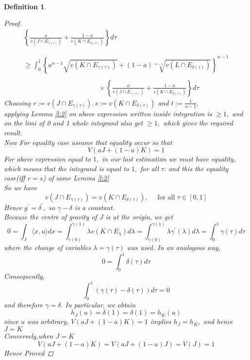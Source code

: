 \documentclass[oneside]{book}
\newtheorem{mydef}{Definition}
\begin{document}
\begin{mydef}
\begin{proof}
\[\begin{array}{l}
 \left\{\frac{a}{v\left(J \cap E_{\gamma(\tau)}\right)}+\frac{1-a}{v\left(K \cap E_{\delta(\tau)}\right)}\right\} d \tau \\\\\\
\geq \int_{0}^{1} \left\{  a^{n-1} \sqrt{v\left(K \cap E_{\gamma(\tau)}\right)}+(1-a) \sqrt[n-1]{v\left(L \cap E_{\delta(\tau)}\right)} \right\}^{n-1} \\\\
\quad \quad \quad \quad \quad \quad \quad \quad \quad \quad \quad \times \left\{ \frac{a}{v\left(J \cap E_{\gamma(\tau)}\right)}+\frac{1-a}{v\left(K \cap E_{\delta(\tau)}\right)}\right\} d \tau
\end{array}
\]
Choosing $r:=v\left(J \cap E_{\gamma(\tau)}\right), s:=v\left(K \cap E_{\delta(\tau)}\right)$ and $t:=\frac{1}{n-1},$
\\
applying  Lemma \ref{l:2} on above expression written inside integration is $\geq 1,$ and on the limi of 0 and 1 whole integrand also get  $\geq 1,$ which gives the required result.
\\
 Now For equality case assume that equality occur so that
\[
V(a J+(1-a) K) = 1 
\]
 For above expression equal to $1,$ in our last estimation we must have equality, which means that the integrand  is equal to $1,$ for all $\tau .
 $ and this the equality case(iff $r = s$) of same Lemma \ref{l:2}
 \\
 So we have 
\[
v\left(J \cap                E_{\gamma(\tau)}\right)=v\left(K \cap E_{\delta(\tau)}\right), \quad \text { for all } \tau \in[0,1]
\]
Hence $g^{\prime}= \delta^{\prime},$ so $\gamma- \delta$ is a constant.\\
Because the centre of gravity of $J$ is at the origin, we get 
\\
\[
0=\int_{J}\langle x, u\rangle d x=\int_{\gamma(0)}^{\gamma(1)} \lambda v\left(K \cap E_{\lambda}\right) d \lambda=\int_{\gamma(0)}^{\gamma(1)} \lambda \gamma^{\prime}(\lambda) d \lambda=\int_{0}^{1} \gamma(\tau) d \tau
\]
where the change of variables $\lambda=\gamma(\tau)$ was used. In an analogous way,
\[
0=\int_{0}^{1} \delta(\tau) d \tau
\]
Consequently,
\[
\int_{0}^{1}(\gamma(\tau)-\delta(\tau)) d \tau=0
\]
and therefore $\gamma=\delta .$ In particular, we obtain
\[
h_{J}(u)=\delta(1)=\delta(1)=h_{K}(u)
\]
since $u$ was arbitrary, $V(a J+(1-a) K)=1$ implies $h_{J}=h_{K},$ and hence $J=K$ \\
Conversely,when $J=K$ 
$$V(a J+(1-a) K)=V(a J+(1-a) J) =  V(J) = 1 $$
Hence Proved
 \end{proof}
 \hfill \break
 

\end{mydef}
\end{document}

